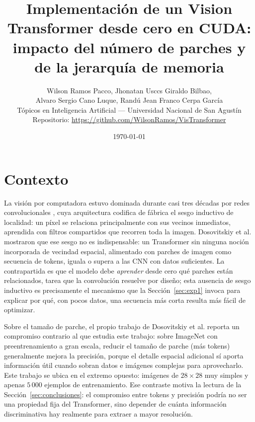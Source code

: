 \documentclass[11pt,a4paper]{article}
\title{\vspace{-1.2cm}Implementación de un Vision Transformer desde cero en CUDA:\\
       impacto del número de parches y de la jerarquía de memoria}
\author{%
  Wilson Ramos Pacco, Jhonatan Usccs Giraldo Bilbao,\\
  Alvaro Sergio Cano Luque, Randú Jean Franco Cerpa García\\[6pt]
  \small Tópicos en Inteligencia Artificial --- Universidad Nacional de San Agustín\\
  \small Repositorio: \url{https://github.com/WilsonRamos/VisTransformer}
}
\date{\today}
\begin{document}
\maketitle
\vspace{-0.8cm}

\section{Contexto}
\label{sec:contexto}

La visión por computadora estuvo dominada durante casi tres décadas por redes
convolucionales \cite{lecun1998gradient}, cuya arquitectura codifica de
fábrica el sesgo inductivo de localidad: un píxel se relaciona
principalmente con sus vecinos inmediatos, aprendida con filtros compartidos
que recorren toda la imagen. Dosovitskiy et al. \cite{dosovitskiy2021image}
mostraron que ese sesgo no es indispensable: un Transformer
\cite{vaswani2017attention} sin ninguna noción incorporada de vecindad
espacial, alimentado con parches de imagen como secuencia de tokens, iguala o
supera a las CNN con datos suficientes. La contrapartida es que el modelo
debe \emph{aprender} desde cero qué parches están relacionados, tarea que la
convolución resuelve por diseño; esta ausencia de sesgo inductivo es
precisamente el mecanismo que la Sección~\ref{sec:exp1} invoca para explicar
por qué, con pocos datos, una secuencia más corta resulta más fácil de
optimizar.

Sobre el tamaño de parche, el propio trabajo de Dosovitskiy et al. reporta un
compromiso contrario al que estudia este trabajo: sobre ImageNet con
preentrenamiento a gran escala, reducir el tamaño de parche (más tokens)
generalmente mejora la precisión, porque el detalle espacial adicional sí
aporta información útil cuando sobran datos e imágenes complejas para
aprovecharlo. Este trabajo se ubica en el extremo opuesto: imágenes de
$28\times28$ muy simples y apenas $5\,000$ ejemplos de entrenamiento. Ese
contraste motiva la lectura de la Sección~\ref{sec:conclusiones}: el
compromiso entre tokens y precisión podría no ser una propiedad fija del
Transformer, sino depender de cuánta información discriminativa hay
realmente para extraer a mayor resolución.
\end{document}
